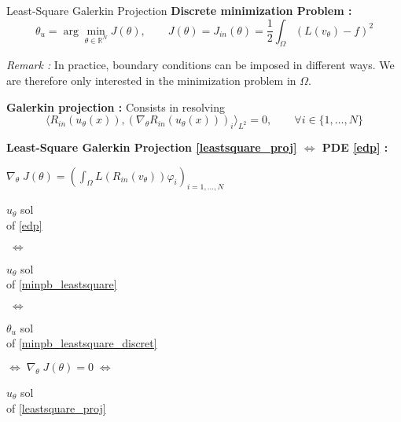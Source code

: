\begin{frame}{Least-Square Galerkin Projection}
	\textbf{Discrete minimization Problem :}
	\begin{equation}
		\theta_u=\arg\min_{\theta\in\mathbb{R}^N} J(\theta), \qquad J(\theta)=J_{in}(\theta)=\frac{1}{2}\int_\Omega (L(v_\theta) - f)^2 \label{minpb_leastsquare_discret}
	\end{equation}
	
	\footnotesize	
	\textit{Remark :} In practice, boundary conditions can be imposed in different ways. We are therefore only interested in the minimization problem in $\Omega$.
	
	\normalsize	
	
	\textbf{Galerkin projection :} Consists in resolving
	\begin{equation}
		\langle R_{in}(u_\theta(x)),(\nabla_\theta R_{in}(u_\theta(x)))_i\rangle_{L^2}=0, \qquad \forall i\in\{1,\dots,N\}\label{leastsquare_proj}
	\end{equation}
	
	\footnotesize
	\begin{center}
		\begin{tcolorbox}[
			colback=white, %
			colframe=other, %
			arc=2mm, %
			boxrule=0.5pt, %
			breakable, enhanced jigsaw,
			width=\linewidth
			]
			
			\textbf{Least-Square Galerkin Projection \eqref{leastsquare_proj} $\Leftrightarrow$ PDE \eqref{edp} :}
			
			\centering
			$\nabla_\theta \; J(\theta)=\left(\int_\Omega L(R_{in}(v_\theta))\varphi_i\right)_{i=1,\dots,N} \qquad $  
			
			\vspace{5pt}
			
			\begin{minipage}{0.1\linewidth}
				\centering
				$u_\theta$ sol \\
				of \eqref{edp}
			\end{minipage} $\; \Leftrightarrow \;$	\begin{minipage}{0.1\linewidth}
				\centering
				$u_\theta$ sol \\
				of \eqref{minpb_leastsquare}
			\end{minipage} $\; \Leftrightarrow \;$	\begin{minipage}{0.1\linewidth}
				\centering
				$\theta_u$ sol \\
				of \eqref{minpb_leastsquare_discret}
			\end{minipage} $\Leftrightarrow \; \nabla_\theta \; J(\theta)=0 \; \Leftrightarrow$ \begin{minipage}{0.1\linewidth}
				\centering
				$u_\theta$ sol \\
				of \eqref{leastsquare_proj}
			\end{minipage}
			

\end{tcolorbox}
\end{center}
\end{frame}
